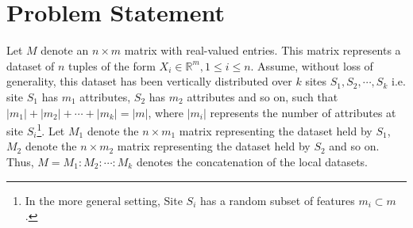 \section{Problem Statement}
\label{sec:probdesc}
Let $M$ denote an $n \times m$ matrix with real-valued entries.  This matrix 
represents a dataset of $n$ tuples of the form $X_i \in \mathbb{R}^m, 1 \le i \le n$.  
Assume, without loss of generality, this dataset has been vertically distributed over $k$ sites $S_1, S_2, \cdots, S_k$ i.e. site $S_1$ has $m_1 $ attributes, $S_2$ has $m_2$ attributes and so on, such that $|m_1| + |m_2|+ \cdots + |m_k| = |m|$, where $|m_i|$ represents the number of attributes at site $S_i$\footnote{In the more general setting, Site $S_i$ has a random subset of features $m_i \subset m$.}. 
Let $M_1$ denote the $n \times m_1$ matrix representing the dataset held by $S_1$,
$M_2$ denote the $n \times m_2$ matrix representing the dataset held by $S_2$ and so on.
Thus, $M = M_1:M_2: \cdots : M_k$ denotes the concatenation of the local datasets. %


